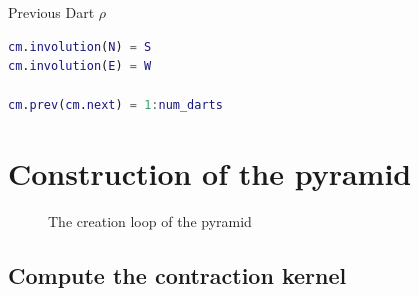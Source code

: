 \documentclass[12pt]{article}
\begin{document}
Previous Dart \( \rho \)

\begin{lstlisting}[language=Matlab]
cm.involution(N) = S
cm.involution(E) = W

cm.prev(cm.next) = 1:num_darts
\end{lstlisting}




\section{Construction of the pyramid} %
\label{sec:construction_of_the_pyramid}

\begin{figure}[tb]
\centering
{}
\caption{The creation loop of the pyramid}%
\label{fig:creation loop}
\end{figure}

\subsection{Compute the contraction kernel} %
\label{sub:compute_the_contraction_kernel}
\end{document}
